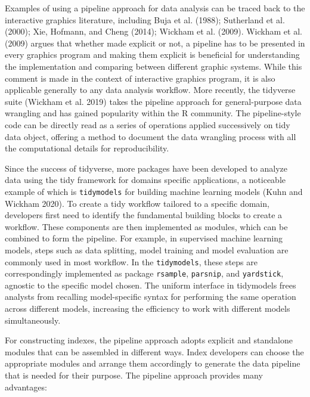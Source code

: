 \documentclass[
]{interact}
\begin{document}
Examples of using a pipeline approach for data analysis can be traced
back to the interactive graphics literature, including Buja et al.
(1988); Sutherland et al. (2000); Xie, Hofmann, and Cheng (2014);
Wickham et al. (2009). Wickham et al. (2009) argues that whether made
explicit or not, a pipeline has to be presented in every graphics
program and making them explicit is beneficial for understanding the
implementation and comparing between different graphic systems. While
this comment is made in the context of interactive graphics program, it
is also applicable generally to any data analysis workflow. More
recently, the tidyverse suite (Wickham et al. 2019) takes the pipeline
approach for general-purpose data wrangling and has gained popularity
within the R community. The pipeline-style code can be directly read as
a series of operations applied successively on tidy data object,
offering a method to document the data wrangling process with all the
computational details for reproducibility.

Since the success of tidyverse, more packages have been developed to
analyze data using the tidy framework for domains specific applications,
a noticeable example of which is \texttt{tidymodels} for building
machine learning models (Kuhn and Wickham 2020). To create a tidy
workflow tailored to a specific domain, developers first need to
identify the fundamental building blocks to create a workflow. These
components are then implemented as modules, which can be combined to
form the pipeline. For example, in supervised machine learning models,
steps such as data splitting, model training and model evaluation are
commonly used in most workflow. In the \texttt{tidymodels}, these steps
are correspondingly implemented as package \texttt{rsample},
\texttt{parsnip}, and \texttt{yardstick}, agnostic to the specific model
chosen. The uniform interface in tidymodels frees analysts from
recalling model-specific syntax for performing the same operation across
different models, increasing the efficiency to work with different
models simultaneously.

For constructing indexes, the pipeline approach adopts explicit and
standalone modules that can be assembled in different ways. Index
developers can choose the appropriate modules and arrange them
accordingly to generate the data pipeline that is needed for their
purpose. The pipeline approach provides many advantages:
\end{document}
